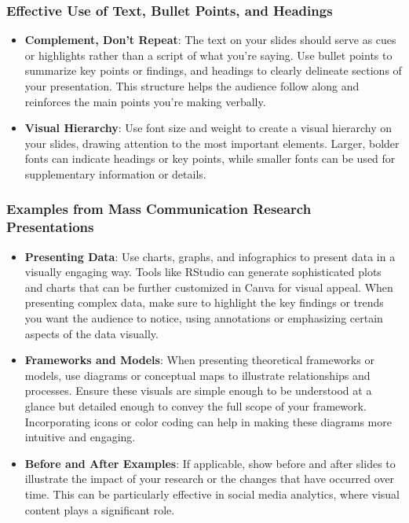 \documentclass[
]{book}
\begin{document}
\hypertarget{effective-use-of-text-bullet-points-and-headings}{%
\subsubsection*{Effective Use of Text, Bullet Points, and Headings}\label{effective-use-of-text-bullet-points-and-headings}}

\begin{itemize}
\item
  \textbf{Complement, Don't Repeat}: The text on your slides should serve as cues or highlights rather than a script of what you're saying. Use bullet points to summarize key points or findings, and headings to clearly delineate sections of your presentation. This structure helps the audience follow along and reinforces the main points you're making verbally.
\item
  \textbf{Visual Hierarchy}: Use font size and weight to create a visual hierarchy on your slides, drawing attention to the most important elements. Larger, bolder fonts can indicate headings or key points, while smaller fonts can be used for supplementary information or details.
\end{itemize}

\hypertarget{examples-from-mass-communication-research-presentations}{%
\subsubsection*{Examples from Mass Communication Research Presentations}\label{examples-from-mass-communication-research-presentations}}

\begin{itemize}
\item
  \textbf{Presenting Data}: Use charts, graphs, and infographics to present data in a visually engaging way. Tools like RStudio can generate sophisticated plots and charts that can be further customized in Canva for visual appeal. When presenting complex data, make sure to highlight the key findings or trends you want the audience to notice, using annotations or emphasizing certain aspects of the data visually.
\item
  \textbf{Frameworks and Models}: When presenting theoretical frameworks or models, use diagrams or conceptual maps to illustrate relationships and processes. Ensure these visuals are simple enough to be understood at a glance but detailed enough to convey the full scope of your framework. Incorporating icons or color coding can help in making these diagrams more intuitive and engaging.
\item
  \textbf{Before and After Examples}: If applicable, show before and after slides to illustrate the impact of your research or the changes that have occurred over time. This can be particularly effective in social media analytics, where visual content plays a significant role.
\end{itemize}
\end{document}
